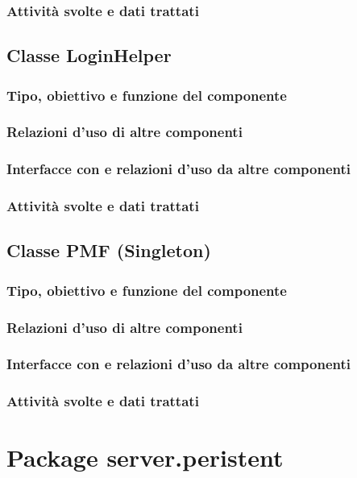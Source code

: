 \subsubsection*{Attivit\`a svolte e dati trattati}

\subsection{Classe LoginHelper}
\subsubsection*{Tipo, obiettivo e funzione del componente}
\subsubsection*{Relazioni d'uso di altre componenti}
\subsubsection*{Interfacce con e relazioni d'uso da altre componenti}
\subsubsection*{Attivit\`a svolte e dati trattati}

\newpage
\subsection{Classe PMF (Singleton)}
\subsubsection*{Tipo, obiettivo e funzione del componente}
\subsubsection*{Relazioni d'uso di altre componenti}
\subsubsection*{Interfacce con e relazioni d'uso da altre componenti}
\subsubsection*{Attivit\`a svolte e dati trattati}

\section{Package server.peristent} %
